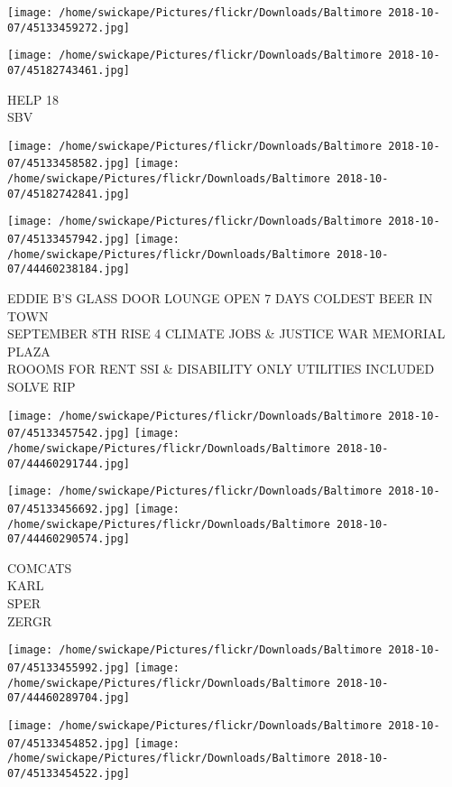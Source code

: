 \documentclass[10pt,letterpaper]{article}
\begin{document}
\texttt{[image: /home/swickape/Pictures/flickr/Downloads/Baltimore 2018-10-07/45133459272.jpg]}

\vspace{0.25in}
\texttt{[image: /home/swickape/Pictures/flickr/Downloads/Baltimore 2018-10-07/45182743461.jpg]}

HELP 18\\
SBV\\
\pagebreak

\texttt{[image: /home/swickape/Pictures/flickr/Downloads/Baltimore 2018-10-07/45133458582.jpg]}
\texttt{[image: /home/swickape/Pictures/flickr/Downloads/Baltimore 2018-10-07/45182742841.jpg]}

\texttt{[image: /home/swickape/Pictures/flickr/Downloads/Baltimore 2018-10-07/45133457942.jpg]}
\texttt{[image: /home/swickape/Pictures/flickr/Downloads/Baltimore 2018-10-07/44460238184.jpg]}

EDDIE B'S GLASS DOOR LOUNGE OPEN 7 DAYS COLDEST BEER IN TOWN\\
SEPTEMBER 8TH RISE 4 CLIMATE JOBS \& JUSTICE WAR MEMORIAL PLAZA\\
ROOOMS FOR RENT SSI \& DISABILITY ONLY UTILITIES INCLUDED\\
SOLVE RIP\\
\pagebreak

\texttt{[image: /home/swickape/Pictures/flickr/Downloads/Baltimore 2018-10-07/45133457542.jpg]}
\texttt{[image: /home/swickape/Pictures/flickr/Downloads/Baltimore 2018-10-07/44460291744.jpg]}

\texttt{[image: /home/swickape/Pictures/flickr/Downloads/Baltimore 2018-10-07/45133456692.jpg]}
\texttt{[image: /home/swickape/Pictures/flickr/Downloads/Baltimore 2018-10-07/44460290574.jpg]}

COMCATS\\
KARL\\
SPER\\
ZERGR\\
\pagebreak

\texttt{[image: /home/swickape/Pictures/flickr/Downloads/Baltimore 2018-10-07/45133455992.jpg]}
\texttt{[image: /home/swickape/Pictures/flickr/Downloads/Baltimore 2018-10-07/44460289704.jpg]}

\texttt{[image: /home/swickape/Pictures/flickr/Downloads/Baltimore 2018-10-07/45133454852.jpg]}
\texttt{[image: /home/swickape/Pictures/flickr/Downloads/Baltimore 2018-10-07/45133454522.jpg]}
\end{document}
